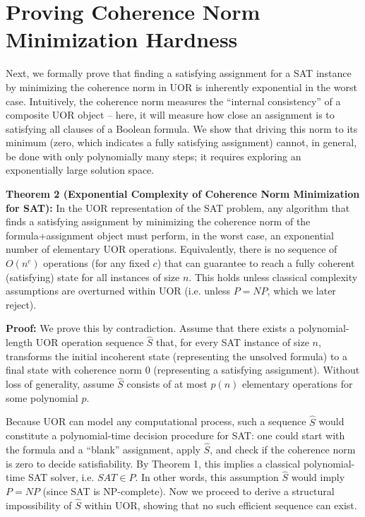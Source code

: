 \documentclass{article}
\begin{document}
\section{Proving Coherence Norm Minimization Hardness}

Next, we formally prove that finding a satisfying assignment for a SAT instance by minimizing the coherence norm in UOR is inherently exponential in the worst case. Intuitively, the coherence norm measures the “internal consistency” of a composite UOR object – here, it will measure how close an assignment is to satisfying all clauses of a Boolean formula. We show that driving this norm to its minimum (zero, which indicates a fully satisfying assignment) cannot, in general, be done with only polynomially many steps; it requires exploring an exponentially large solution space.

\medskip
\textbf{Theorem 2 (Exponential Complexity of Coherence Norm Minimization for SAT):} In the UOR representation of the SAT problem, any algorithm that finds a satisfying assignment by minimizing the coherence norm of the formula+assignment object must perform, in the worst case, an exponential number of elementary UOR operations. Equivalently, there is no sequence of $O(n^c)$ operations (for any fixed $c$) that can guarantee to reach a fully coherent (satisfying) state for all instances of size $n$. This holds unless classical complexity assumptions are overturned within UOR (i.e. unless $P=NP$, which we later reject).

\medskip
\textbf{Proof:} We prove this by contradiction. Assume that there exists a polynomial-length UOR operation sequence $\hat{S}$ that, for every SAT instance of size $n$, transforms the initial incoherent state (representing the unsolved formula) to a final state with coherence norm $0$ (representing a satisfying assignment). Without loss of generality, assume $\hat{S}$ consists of at most $p(n)$ elementary operations for some polynomial $p$.

Because UOR can model any computational process, such a sequence $\hat{S}$ would constitute a polynomial-time decision procedure for SAT: one could start with the formula and a “blank” assignment, apply $\hat{S}$, and check if the coherence norm is zero to decide satisfiability. By Theorem 1, this implies a classical polynomial-time SAT solver, i.e. $SAT \in P$. In other words, this assumption $\hat{S}$ would imply $P=NP$ (since SAT is NP-complete). Now we proceed to derive a structural impossibility of $\hat{S}$ within UOR, showing that no such efficient sequence can exist.
\end{document}
